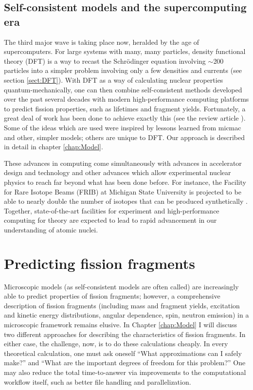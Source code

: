 \subsection{Self-consistent models and the supercomputing era}
The third major wave is taking place now, heralded by the age of supercomputers. For large systems with many, many particles, density functional theory (DFT) is a way to recast the Schr\"{o}dinger equation involving $\sim$200 particles into a simpler problem involving only a few densities and currents (see section \ref{sect:DFT}). With DFT as a way of calculating nuclear properties quantum-mechanically, one can then combine self-consistent methods developed over the past several decades with modern high-performance computing platforms to predict fission properties, such as lifetimes and fragment yields. Fortunately, a great deal of work has been done to achieve exactly this (see the review article \cite{Schunck2016}). Some of the ideas which are used were inspired by lessons learned from micmac and other, simpler models; others are unique to DFT. Our approach is described in detail in chapter \ref{chap:Model}.

These advances in computing come simultaneously with advances in accelerator design and technology and other advances which allow experimental nuclear physics to reach far beyond what has been done before. For instance, the Facility for Rare Isotope Beams (FRIB) at Michigan State University is projected to be able to nearly double the number of isotopes that can be produced synthetically \cite{Baumann2016}. Together, state-of-the-art facilities for experiment and high-performance computing for theory are expected to lead to rapid advancement in our understanding of atomic nuclei.

\section{Predicting fission fragments}
Microscopic models (as self-consistent models are often called) are increasingly able to predict properties of fission fragments; however, a comprehensive description of fission fragments (including mass and fragment yields, excitation and kinetic energy distributions, angular dependence, spin, neutron emission) in a microscopic framework remains elusive. In Chapter \ref{chap:Model} I will discuss two different approaches for describing the characteristics of fission fragments. In either case, the challenge, now, is to do these calculations cheaply. In every theoretical calculation, one must ask oneself ``What approximations can I safely make?'' and ``What are the important degrees of freedom for this problem?'' One may also reduce the total time-to-answer via improvements to the computational workflow itself, such as better file handling and parallelization.

